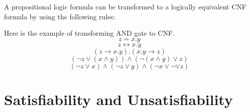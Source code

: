 \documentclass[12pt]{book}
\begin{document}
A propositional logic formula can be transformed to a logically equivalent CNF formula by using the following rules:
\begin{enumerate}
      \item $ a = b \Longleftrightarrow a \leftrightarrow b$.
      \item $a \leftrightarrow b \Longleftrightarrow (a \rightarrow b) \wedge (b \rightarrow a)}$.
      \item $ a \rightarrow b \Longleftrightarrow \neg a \vee b$.
	  \item $ a + b \Longleftrightarrow a \vee b$.
	  \item $ a . b \Longleftrightarrow a \wedge b$.
\end{enumerate}
\begin{examp}\label{exp:tocnf}
      Here is the example of transforming AND gate to CNF.
      $$ z = x . y$$
      $$ z  \leftrightarrow x . y$$
      $$(z \rightarrow x . y) . (x . y \rightarrow z)$$
      $$ ( \neg z \vee (x \wedge y)) \wedge (\neg (x \wedge y) \vee z)$$
      $$ (\neg z \vee x) \wedge ( \neg z \vee y) \wedge ( \neg x \vee \neg \vee z)$$
\end{examp}  
\section{Satisfiability and Unsatisfiability}
\label{sec:Satisfiability and Unsatisfiability}
\end{document}

